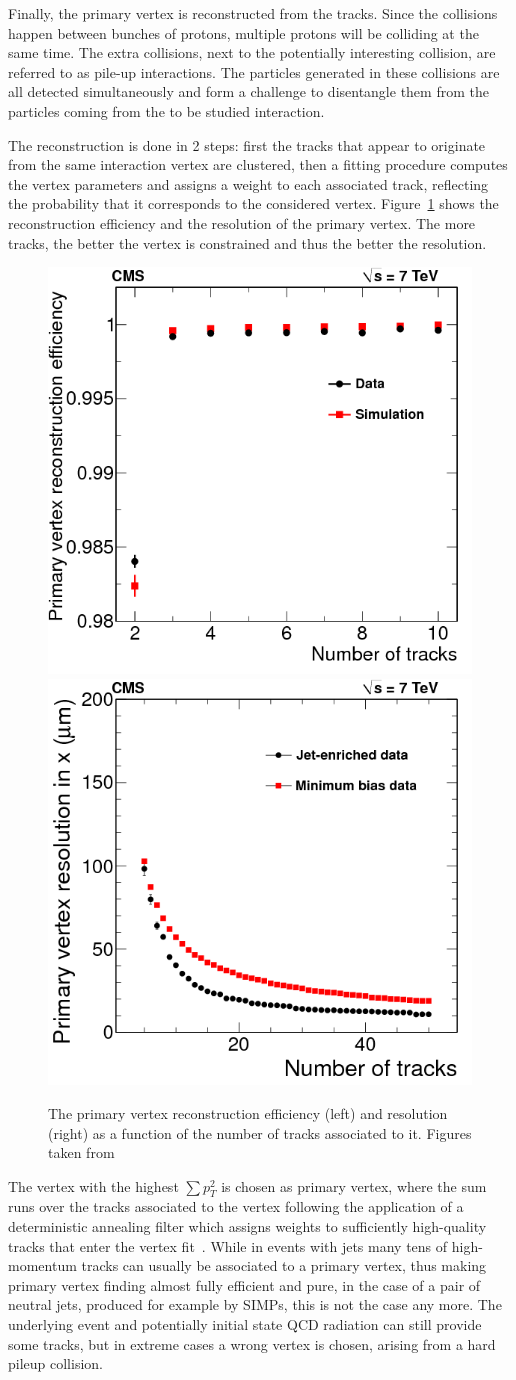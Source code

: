 Finally, the primary vertex is reconstructed from the tracks. Since the collisions happen between bunches of protons, multiple protons will be colliding at the same time. The extra collisions, next to the potentially interesting collision, are referred to as pile-up interactions. The particles generated in these collisions are all detected simultaneously and form a challenge to disentangle them from the particles coming from the to be studied interaction.

The reconstruction is done in 2 steps: first the tracks that appear to originate from the same interaction vertex are clustered, then a fitting procedure computes the vertex parameters and assigns a weight to each associated track, reflecting the probability that it corresponds to the considered vertex. Figure~\ref{fig:PV} shows the reconstruction efficiency and the resolution of the primary vertex. The more tracks, the better the vertex is constrained and thus the better the resolution.

\begin{figure}[ht]
  \centering
\includegraphics[width=.4\textwidth]{PV_eff}\hspace{1cm}
 \includegraphics[width=.4\textwidth]{PV_res} 
 \caption{The primary vertex reconstruction efficiency (left) and resolution (right) as a function of the number of tracks associated to it. Figures taken from~\cite{Chatrchyan:2014fea}}
 \label{fig:PV}
\end{figure}

The vertex with the highest $\sum p_T^2$ is chosen as primary vertex, where the sum runs over the tracks associated to the vertex following the application of a deterministic annealing filter which assigns weights to sufficiently high-quality tracks that enter the vertex fit~\cite{Chatrchyan:2014fea}. While in events with jets many tens of high-momentum tracks can usually be associated to a primary vertex, thus making primary vertex finding almost fully efficient and pure, in the case of a pair of neutral jets, produced for example by \acp{SIMP}, this is not the case any more. The underlying event and potentially initial state \acs{QCD} radiation can still provide some tracks, but in extreme cases a wrong vertex is chosen, arising from a hard pileup collision.

